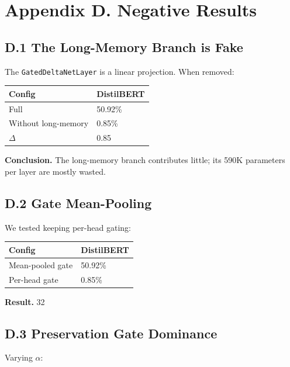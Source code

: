 
\section{Appendix D. Negative Results}

\subsection{D.1 The Long-Memory Branch is Fake}

The \texttt{GatedDeltaNetLayer} is a linear projection. When removed:

\begin{table}[H]
\centering
\small
\begin{tabular}{ll}
\toprule
\textbf{Config} & \textbf{DistilBERT} \\
\midrule
Full & 50.92\% \\
Without long-memory & 0.85\% \\
$\Delta$ & 0.85 \\
\bottomrule
\end{tabular}
\end{table}

\textbf{Conclusion.} The long-memory branch contributes little; its 590K 
parameters per layer are mostly wasted.

\subsection{D.2 Gate Mean-Pooling}

We tested keeping per-head gating:

\begin{table}[H]
\centering
\small
\begin{tabular}{ll}
\toprule
\textbf{Config} & \textbf{DistilBERT} \\
\midrule
Mean-pooled gate & 50.92\% \\
Per-head gate & 0.85\% \\
\bottomrule
\end{tabular}
\end{table}

\textbf{Result.} 32

\subsection{D.3 Preservation Gate Dominance}

Varying $\alpha$:

